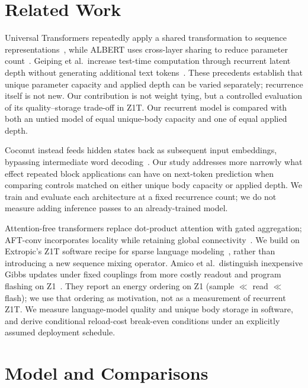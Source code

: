 \documentclass{article}
\begin{document}
\section{Related Work}

Universal Transformers repeatedly apply a shared transformation to sequence representations~\cite{dehghani2019}, while ALBERT uses cross-layer sharing to reduce parameter count~\cite{lan2020}. Geiping et al.\ increase test-time computation through recurrent latent depth without generating additional text tokens~\cite{geiping2025}. These precedents establish that unique parameter capacity and applied depth can be varied separately; recurrence itself is not new. Our contribution is not weight tying, but a controlled evaluation of its quality--storage trade-off in Z1T. Our recurrent model is compared with both an untied model of equal unique-body capacity and one of equal applied depth.

Coconut instead feeds hidden states back as subsequent input embeddings, bypassing intermediate word decoding~\cite{hao2024}. Our study addresses more narrowly what effect repeated block applications can have on next-token prediction when comparing controls matched on either unique body capacity or applied depth. We train and evaluate each architecture at a fixed recurrence count; we do not measure adding inference passes to an already-trained model.

Attention-free transformers replace dot-product attention with gated aggregation; AFT-conv incorporates locality while retaining global connectivity~\cite{zhai2021}. We build on Extropic's Z1T software recipe for sparse language modeling~\cite{extropic2026z1t}, rather than introducing a new sequence mixing operator. Amico et al.\ distinguish inexpensive Gibbs updates under fixed couplings from more costly readout and program flashing on Z1~\cite{amico2026}. They report an energy ordering on Z1 (sample $\ll$ read $\ll$ flash); we use that ordering as motivation, not as a measurement of recurrent Z1T. We measure language-model quality and unique body storage in software, and derive conditional reload-cost break-even conditions under an explicitly assumed deployment schedule.

\section{Model and Comparisons}
\end{document}
